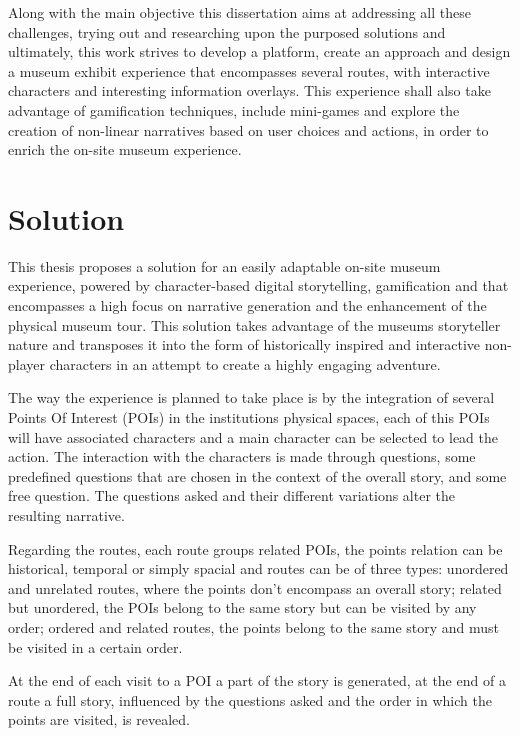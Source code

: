 Along with the main objective this dissertation aims at addressing all these challenges, trying out and researching upon the purposed solutions
and ultimately, this work strives to develop a platform, create an approach and design a museum exhibit experience that encompasses several routes,
with interactive characters and interesting information overlays. This experience shall also take advantage of gamification techniques, include mini-games
and explore the creation of non-linear narratives based on user choices and actions, in order to enrich the on-site museum experience.

\section{Solution}
\label{sec:solution}
This thesis proposes a solution for an easily adaptable on-site museum experience, powered by character-based digital storytelling, gamification and that 
encompasses a high focus on narrative generation and the enhancement of the physical museum tour. This solution takes advantage of the museums storyteller
nature and transposes it into the form of historically inspired and interactive non-player characters in an attempt to create a highly engaging adventure.

The way the experience is planned to take place is by the integration of several Points Of Interest (POIs) in the institutions physical spaces, each of this POIs will
have associated characters and a main character can be selected to lead the action. The interaction with the characters is made through questions,
some predefined questions that are chosen in the context of the overall story, and some free question. The questions asked and their different variations
alter the resulting narrative.

Regarding the routes, each route groups related POIs, the points relation can be historical, temporal or simply spacial and routes can be of three types:
unordered and unrelated routes, where the points don't encompass an overall story; related but unordered, the POIs belong to the same story but can be visited
by any order; ordered and related routes, the points belong to the same story and must be visited in a certain order.

At the end of each visit to a POI a part of the story is generated, at the end of a route a full story, influenced by the questions asked and the order in which the points
are visited, is revealed.

